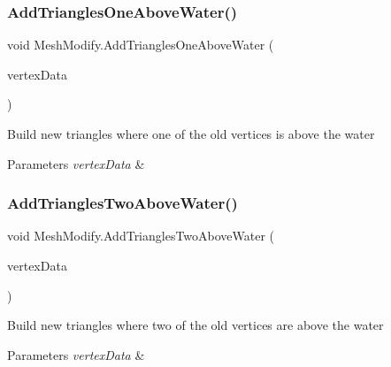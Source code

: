 \subsubsection{\texorpdfstring{Add\+Triangles\+One\+Above\+Water()}{AddTrianglesOneAboveWater()}}
{\footnotesize\ttfamily void Mesh\+Modify.\+Add\+Triangles\+One\+Above\+Water (\begin{DoxyParamCaption}\item[{List$<$ \hyperlink{class_mesh_modify_1_1_vertex_data}{Vertex\+Data} $>$}]{vertex\+Data }\end{DoxyParamCaption})\hspace{0.3cm}{\ttfamily [private]}}



Build new triangles where one of the old vertices is above the water 


\begin{DoxyParams}{Parameters}
{\em vertex\+Data} & \\
\hline
\end{DoxyParams}
\mbox{\label{class_mesh_modify_a97a32e877e4dcd875dac22d49b30d083}} 
\subsubsection{\texorpdfstring{Add\+Triangles\+Two\+Above\+Water()}{AddTrianglesTwoAboveWater()}}
{\footnotesize\ttfamily void Mesh\+Modify.\+Add\+Triangles\+Two\+Above\+Water (\begin{DoxyParamCaption}\item[{List$<$ \hyperlink{class_mesh_modify_1_1_vertex_data}{Vertex\+Data} $>$}]{vertex\+Data }\end{DoxyParamCaption})\hspace{0.3cm}{\ttfamily [private]}}



Build new triangles where two of the old vertices are above the water 


\begin{DoxyParams}{Parameters}
{\em vertex\+Data} & \\
\hline
\end{DoxyParams}
\mbox{\label{class_mesh_modify_ad3ec1d4ecf9ba803cbfe796c9a300cc8}} 
